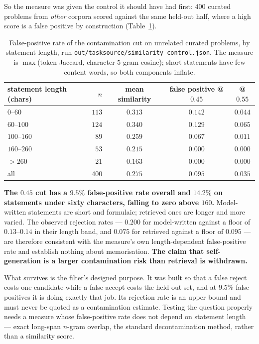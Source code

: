 So the measure was given the control it should have had first: $400$ curated problems from
\emph{other} corpora scored against the same held-out half, where a high score is a false
positive by construction (Table~\ref{tab:simcontrol}).

\begin{table}[t]
\centering\small
\caption{False-positive rate of the contamination cut on unrelated curated problems, by
statement length, run \texttt{out/tasksource/similarity\_control.json}. The measure is
$\max$(token Jaccard, character $5$-gram cosine); short statements have few content words, so
both components inflate.}
\label{tab:simcontrol}
\begin{tabular}{lrccc}
\toprule
statement length (chars) & $n$ & mean similarity & false positive @$0.45$ & @$0.55$ \\
\midrule
$0$--$60$      & $113$ & $0.313$ & $0.142$ & $0.044$ \\
$60$--$100$    & $124$ & $0.340$ & $0.129$ & $0.065$ \\
$100$--$160$   & $89$  & $0.259$ & $0.067$ & $0.011$ \\
$160$--$260$   & $53$  & $0.215$ & $0.000$ & $0.000$ \\
$>260$         & $21$  & $0.163$ & $0.000$ & $0.000$ \\
\midrule
all            & $400$ & $0.275$ & $\mathbf{0.095}$ & $0.035$ \\
\bottomrule
\end{tabular}
\end{table}

\textbf{The $0.45$ cut has a $9.5\%$ false-positive rate overall and $14.2\%$ on statements
under sixty characters, falling to zero above $160$.} Model-written statements are short and
formulaic; retrieved ones are longer and more varied. The observed rejection rates --- $0.200$
for model-written against a floor of $0.13$--$0.14$ in their length band, and $0.075$ for
retrieved against a floor of $0.095$ --- are therefore consistent with the measure's own
length-dependent false-positive rate and establish nothing about memorisation. \textbf{The
claim that self-generation is a larger contamination risk than retrieval is withdrawn.}

What survives is the filter's designed purpose. It was built so that a false reject costs one
candidate while a false accept costs the held-out set, and at $9.5\%$ false positives it is
doing exactly that job. Its rejection rate is an upper bound and must never be quoted as a
contamination estimate. Testing the question properly needs a measure whose false-positive rate
does not depend on statement length --- exact long-span $n$-gram overlap, the standard
decontamination method, rather than a similarity score.

